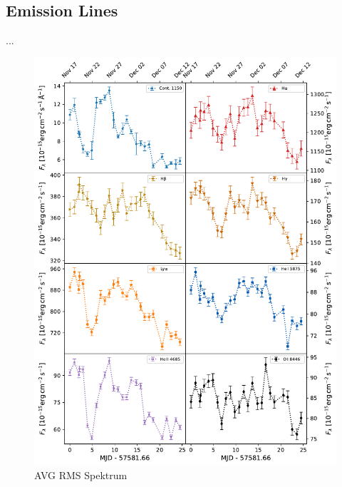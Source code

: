 \subsection{Emission Lines}
...

\begin{figure}[!ht]
	\centering
	\includegraphics[width=1\textwidth]{pictures/Chapter4/lightcurves/NGC4593_Lines_Cont1150_not_optical_calibrated.pdf}
	\caption{AVG RMS Spektrum}
	\label{fig:emission_line_lightcurves_hst}
\end{figure}

